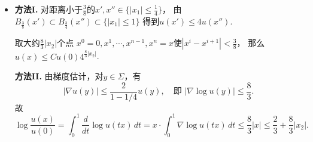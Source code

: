 \begin{itemize}
    \textbf{方法II.} 对任何两点$y,z$，记$d=|y-z|$，
    \begin{align*}
        |u(y)-u(z)|
        &=\frac{1}{|B_r|}\bigg|\int_{B_r(y)}u(x)\,dx-\int_{B_r(z)}u(x)\,dx\bigg|\\
        &\leqslant\frac{1}{|B_r|}\int_{B_{r+\frac{d}{2}}(\frac{y+z}{2})}u(x)\,dx
        -\int_{B_{r-\frac{d}{2}}(\frac{y+z}{2})}u(x)\,dx\\
        &=\frac{\big|B_{r+\frac{d}{2}}\big|-\big|B_{r-\frac{d}{2}}\big|}{|B_r|}u\Big(\frac{y+z}{2}\Big)\\
        &\leqslant C\frac{d}{r}u\Big(\frac{y+z}{2}\Big)\rightarrow0\quad\text{当 }r\rightarrow+\infty.
    \end{align*}

    \item[10.]
    \textbf{方法I.} 对距离小于$\frac{3}{8}$的$x',x''\in\big\{|x_1|\leqslant\frac{1}{4}\big\}$，
    由$B_{\frac{3}{8}}(x')\subset B_{\frac{3}{4}}(x'')\subset\{|x_1|\leqslant1\}$
    得到$u(x')\leqslant4u(x'')$.
    
    取大约$\frac{8}{3}|x_2|$个点
    $x^0=0,x^1,\cdots,x^{n-1},x^n=x$使$|x^i-x^{i+1}|<\frac{3}{8}$，
    那么$u(x)\leqslant Cu(0)4^{\frac{8}{3}|x_2|}$.

    \textbf{方法II.} 由梯度估计，对$y\in\varSigma$，有
    $$|\nabla u(y)|\leqslant\frac{2}{1-1/4}u(y),\quad\text{即 }
    |\nabla\log u(y)|\leqslant\frac{8}{3}.$$
    故
    $$\log\frac{u(x)}{u(0)}=\int_0^1\frac{d}{dt}\log u(tx)\,dt
    =x\cdot\int_0^1\nabla\log u(tx)\,dt\leqslant\frac{8}{3}|x|
    \leqslant\frac{2}{3}+\frac{8}{3}|x_2|.$$


\end{itemize}
